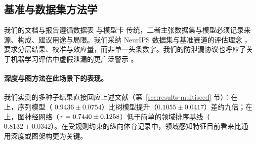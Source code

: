 \subsection{基准与数据集方法学}
\label{sec:related-methodology}

我们的文档与报告遵循数据表 \citep{datasheets} 与模型卡 \citep{model_cards} 传统，二者主张数据集与模型必须记录来源、构成、建议用途与局限。我们采纳 NeurIPS 数据集与基准赛道的评估理念 \citep{neurips_dnb}，要求分层结果、校准与效应量，而非单一头条数字。我们的防泄漏协议也呼应了关于机器学习评估中虚假泄漏的更广泛警示 \citep{leakage_kaufman}。

\paragraph{深度与图方法在此场景下的表现。}我们实测的多种子结果直接回应上述文献（第~\ref{sec:results-multiseed} 节）：在  上，序列模型（\maelog{} $0.9436\pm0.0754$）比树模型提升（$0.1055\pm0.0417$）差约九倍；在  上，图神经网络（$\tau=0.7440\pm0.1258$）低于简单的领域排序基线（$0.8132\pm0.0342$）。在受规则约束的纵向体育记录中，领域感知特征目前看来比通用深度或图架构更为关键。

